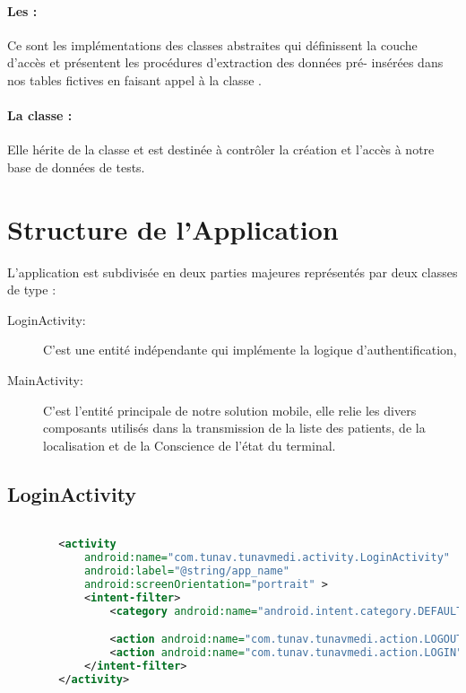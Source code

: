 \paragraph{Les :} 

Ce sont les implémentations des classes abstraites qui définissent la
couche d’accès et présentent les procédures d'extraction des données pré-
insérées dans nos tables fictives en faisant appel à la classe
 .

\paragraph[La classe \dev{DBSetup}:]{La classe :} 

Elle hérite de la classe  et est destinée à
contrôler la création et l’accès à notre base de données de tests.

\section{Structure de l'Application}

L'application est subdivisée en deux parties majeures représentés par deux classes de type  :

\begin{description}

\item [LoginActivity:] C'est une entité indépendante qui implémente la logique d'authentification, 

\item [MainActivity:] C'est l'entité principale de notre solution mobile, elle relie les divers composants utilisés dans la transmission de la liste des patients, de la localisation et de la Conscience de l'état du terminal.

\end{description}

\subsection{LoginActivity}


\begin{lstlisting}[language=xml, caption=Déclaration de LoginActivity dans AndroidManifest]

        <activity
            android:name="com.tunav.tunavmedi.activity.LoginActivity"
            android:label="@string/app_name"
            android:screenOrientation="portrait" >
            <intent-filter>
                <category android:name="android.intent.category.DEFAULT" />

                <action android:name="com.tunav.tunavmedi.action.LOGOUT" />
                <action android:name="com.tunav.tunavmedi.action.LOGIN" />
            </intent-filter>
        </activity>

\end{lstlisting}


